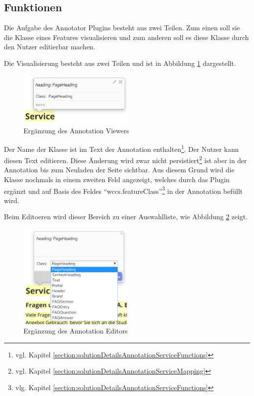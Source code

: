 \subsection{Funktionen}
    Die Aufgabe des Annotator Plugins besteht aus zwei Teilen.
    Zum einen soll sie die Klasse eines Features visualisieren
    und zum anderen soll es diese Klasse durch den Nutzer editierbar machen.

    Die Visualisierung besteht aus zwei Teilen und ist in Abbildung
    \ref{image:annotatorPluginViewer} dargestellt.

    \begin{figure}[htb]
        \centering
        \includegraphics[width=0.5\textwidth]{../resources/annotator-plugin/viewer.png}
        \caption{Ergänzung des Annotation Viewers}
        \label{image:annotatorPluginViewer}
    \end{figure}

    Der Name der Klasse ist im Text der Annotation
    enthalten\footnote{vgl. Kapitel \ref{section:solutionDetailsAnnotationServiceFunctions}}.
    Der Nutzer kann diesen Text editieren.
    Diese Änderung wird zwar nicht
    persistiert\footnote{vgl. Kapitel \ref{section:solutionDetailsAnnotationServiceMapping}}
    ist aber in der Annotation bis zum Neuladen der Seite sichtbar.
    Aus diesem Grund wird die Klasse nochmals in einem zweiten Feld angezeigt,
    welches durch das Plugin ergänzt und auf Basis des Feldes
    "`wccs.featureClass"'\footnote{vlg. Kapitel \ref{section:solutionDetailsAnnotationServiceFunctions}}
    in der Annotation befüllt wird.

    Beim Editoeren wird dieser Bereich zu einer Auswahlliste,
    wie Abbildung \ref{image:annotatorPluginEditor} zeigt.

    \begin{figure}[htb]
        \centering
        \includegraphics[width=0.5\textwidth]{../resources/annotator-plugin/editor.png}
        \caption{Ergänzung des Annotation Editors}
        \label{image:annotatorPluginEditor}
    \end{figure}

